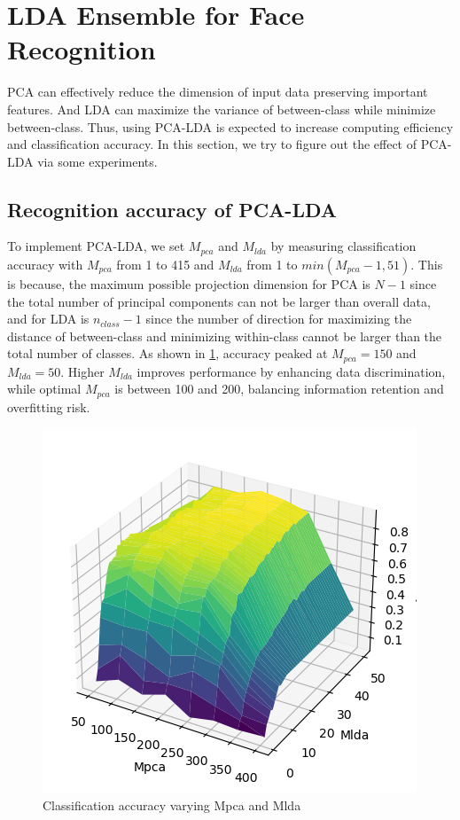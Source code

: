 \section{LDA Ensemble for Face Recognition}
\label{sec:intro}

PCA can effectively reduce the dimension of input data preserving important features. And LDA can maximize the variance of between-class while minimize between-class. Thus, using PCA-LDA is expected to increase computing efficiency and classification accuracy. In this section, we try to figure out the effect of PCA-LDA via some experiments.

\subsection{Recognition accuracy of PCA-LDA}

To implement PCA-LDA, we set $M_{pca}$ and $M_{lda}$ by measuring classification accuracy with $M_{pca}$ from 1 to 415 and $M_{lda}$ from 1 to $min(M_{pca}-1, 51)$. This is because, the maximum possible projection dimension for PCA is $N-1$ since the total number of principal components can not be larger than overall data, and for LDA is $n_{class}-1$ since the number of direction for maximizing the distance of between-class and minimizing within-class cannot be larger than the total number of classes. As shown in \cref{fig:mpca_mlda}, accuracy peaked at $M_{pca}=150$ and $M_{lda}=50$. Higher $M_{lda}$ improves performance by enhancing data discrimination, while optimal $M_{pca}$ is between 100 and 200, balancing information retention and overfitting risk.


\begin{figure}[htbp]
  \centering
   \includegraphics[width=0.65\linewidth]{image/mpca_mlda.png}

   \caption{Classification accuracy varying Mpca and Mlda}
   \label{fig:mpca_mlda}
\end{figure}
\vspace{-0.5cm}


